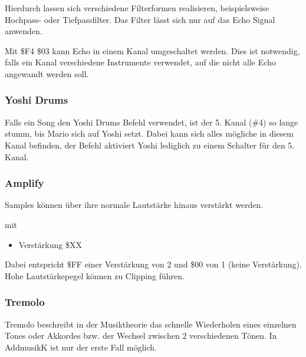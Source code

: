 \medskip

Hierdurch lassen sich verschiedene Filterformen realisieren, beispielsweise Hochpass- oder Tiefpassfilter.
Das Filter lässt sich nur auf das Echo Signal anwenden.

\bigskip

Mit \$F4 \$03 kann Echo in einem Kanal umgeschaltet werden. Dies ist notwendig, falls ein Kanal verschiedene Instrumente verwendet, auf die nicht alle Echo angewandt werden soll.

\subsubsection{Yoshi Drums}

Falls ein Song den Yoshi Drums Befehl verwendet, ist der 5. Kanal (\#4) so lange stumm, bis Mario sich auf Yoshi setzt. Dabei kann sich alles mögliche in diesem Kanal befinden, der Befehl aktiviert Yoshi lediglich zu einem Schalter für den 5. Kanal.

\medskip



\medskip

\subsubsection{Amplify}

Samples können über ihre normale Lautstärke hinaus verstärkt werden.

\medskip



\medskip

mit

\begin{itemize}
	\item Verstärkung \$XX
\end{itemize}

Dabei entspricht \$FF einer Verstärkung von 2 und \$00 von 1 (keine Verstärkung). Hohe Lautstärkepegel können zu Clipping führen.

\subsubsection{Tremolo}

Tremolo beschreibt in der Musiktheorie das schnelle Wiederholen eines einzelnen Tones oder Akkordes bzw. der Wechsel zwischen 2 verschiedenen Tönen. In AddmusikK ist nur der erste Fall möglich.

